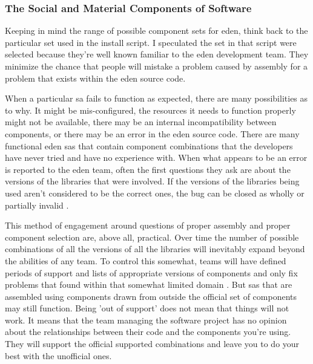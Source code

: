 \documentclass[a4paper,man,natbib,floatsintext]{apa6}
\begin{document}
   \subsubsection{The Social and Material Components of Software}
   Keeping in mind the range of possible component sets for \acrshort{eden}, think back to the particular set used in the install script. I speculated the set in that script were selected because they're well known familiar to the \acrshort{eden} development team. They minimize the chance that people will mistake a problem caused by assembly for a problem that exists within the \acrshort{eden} source code.  

   When a particular \gls{sa} fails to function as expected, there are many possibilities as to why. It might be mis-configured, the resources it needs to function properly might not be available, there may be an internal incompatibility between components, or there may be an error in the \acrshort{eden} source code. There are many functional \acrshort{eden} \glspl{sa} that contain component combinations that the developers have never tried and have no experience with. When what appears to be an error is reported to the \acrshort{eden} team, often the first questions they ask are about the versions of the libraries that were involved. If the versions of the libraries being used aren't considered to be the correct ones, the bug can be closed as wholly or partially invalid \citep{Trendspotter2020-ps}.

   This method of engagement around questions of proper assembly and proper component selection are, above all, practical. Over time the number of possible combinations of all the versions of all the libraries will inevitably expand beyond the abilities of any team. To control this somewhat, teams will have defined periods of support and lists of appropriate versions of components and only fix problems that found within that somewhat limited domain \citep{Canonical2020-ru,Konig2019-ya}. But \glspl{sa} that are assembled using components drawn from outside the official set of components may still function. Being 'out of support' does not mean that things will not work. It means that the team managing the software project has no opinion about the relationships between their code and the components you're using. They will support the official supported combinations and leave you to do your best with the unofficial ones.
\end{document}
